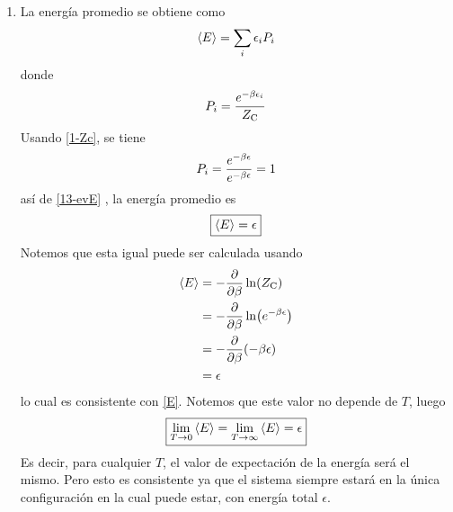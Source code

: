 \begin{sol}
\begin{enumerate}
\item 
La energía promedio se obtiene como
\begin{align}\label{13-evE}
  \ev{E}=\sumi \epsilon_iP_i
\end{align}
donde
\begin{equation}
	P_i=\frac{e^{-\beta \epsilon_i}}{Z_{\rm C} }
\end{equation}
Usando \eqref{1-Zc}, se tiene
\begin{equation}
  P_i=\frac{e^{-\beta \epsilon}}{e^{-\beta \epsilon}}=1
\end{equation}
así de \eqref{13-evE} , la energía promedio es
\begin{equation}\label{E}
\boxed{  \ev{E}=\epsilon}
\end{equation}
Notemos que esta igual puede ser calculada usando
\begin{align}
  \ev{E}&=-\pdv{\b}\ln (\zc)\\
  &=-\pdv{\b}\ln(e^{-\b \epsilon})\\
  &=-\pdv{\b}(-\b \epsilon)\\
  &=\epsilon
\end{align}
lo cual es consistente con \eqref{E}. Notemos que este valor no depende de $T$, luego
\begin{equation}
  \boxed{\lim_{T\to 0}\ev{E}= \lim_{T\to\infty}\ev{E}=\epsilon}
\end{equation}
Es decir, para cualquier $T$, el valor de expectación de la energía será el mismo. Pero esto es consistente ya que el sistema siempre estará en la única configuración en la cual puede estar, con energía total $\epsilon$.


\end{enumerate}
\end{sol}
